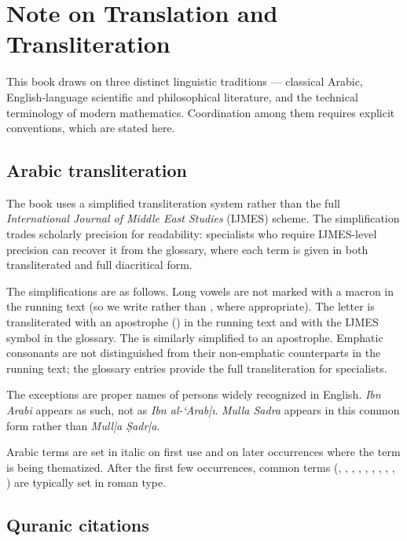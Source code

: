 \chapter*{Note on Translation and Transliteration}

This book draws on three distinct linguistic traditions --- classical
Arabic, English-language scientific and philosophical literature, and
the technical terminology of modern mathematics. Coordination among
them requires explicit conventions, which are stated here.

\section*{Arabic transliteration}

The book uses a simplified transliteration system rather than the
full \textit{International Journal of Middle East Studies} (IJMES)
scheme. The simplification trades scholarly precision for readability:
specialists who require IJMES-level precision can recover it from the
glossary, where each term is given in both transliterated and full
diacritical form.

The simplifications are as follows. Long vowels are not marked with a
macron in the running text (so we write  rather than
, where appropriate). The letter  is
transliterated with an apostrophe () in the running text and
with the IJMES symbol  in the glossary. The 
is similarly simplified to an apostrophe. Emphatic consonants are not
distinguished from their non-emphatic counterparts in the running
text; the glossary entries provide the full transliteration for
specialists.

The exceptions are proper names of persons widely recognized in
English. \textit{Ibn Arabi} appears as such, not as
\textit{Ibn al-`Arab\bar{\i}}. \textit{Mulla Sadra} appears in this
common form rather than \textit{Mull\bar{a} \d{S}adr\bar{a}}.

Arabic terms are set in italic on first use and on later occurrences
where the term is being thematized. After the first few occurrences,
common terms (, , ,
, , , ,
, , ) are typically set in
roman type.

\section*{Quranic citations}

